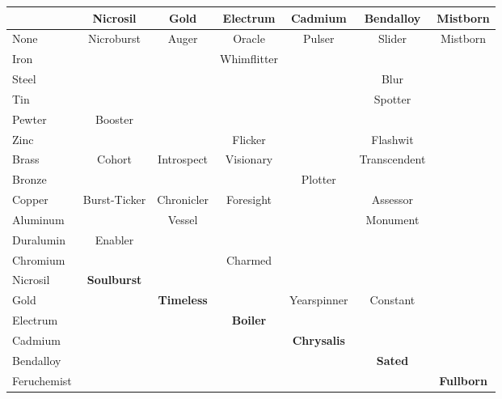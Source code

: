 \documentclass[conference]{IEEEtran}
\newcommand{\n}{\hfill\break}
\begin{document}
\begin{table}[h]
\begin{center}
\begin{tabular}{|l |c |c |c |c |c |c | }
		\cellcolor{black}&Nicrosil&Gold&Electrum&Cadmium&Bendalloy&Mistborn\\\hline
		
		\hline
		None&\cellcolor{darkgreen}Nicroburst&\cellcolor{darkgreen}Auger&\cellcolor{darkgreen}Oracle&\cellcolor{darkgreen}Pulser&\cellcolor{darkgreen}Slider&\cellcolor{darkgreen}Mistborn\\\hline
		Iron& & &\cellcolor{lightgreen}Whimflitter& & & \\\hline
		Steel& & & & &\cellcolor{lightgreen} Blur& \\\hline
		Tin& & & & & \cellcolor{lightgreen}Spotter & \\\hline
		Pewter&\cellcolor{lightgreen}Booster& & & & & \\\hline
		Zinc & & &\cellcolor{lightgreen}Flicker& &\cellcolor{lightgreen}Flashwit& \\\hline
		Brass &\cellcolor{lightorange}Cohort&\cellcolor{lightorange}Introspect &\cellcolor{lightred} Visionary & &\cellcolor{lightorange}Transcendent & \\\hline
		Bronze&& & &\cellcolor{lightgreen}Plotter & & \\\hline
		Copper&\cellcolor{lightgreen}Burst-Ticker &\cellcolor{lightgreen} Chronicler & \cellcolor{lightgreen}Foresight & &  \cellcolor{lightgreen}Assessor& \\\hline
		Aluminum & & \cellcolor{lightgreen} Vessel& & &\cellcolor{lightgreen}Monument& \\\hline
		Duralumin&\cellcolor{lightgreen}Enabler& & & & & \\\hline
		Chromium &  & & \cellcolor{lightgreen}Charmed &  &  &  \\\hline
		Nicrosil& \cellcolor{lightgreen}\textbf{Soulburst} & &  &  &  &  \\\hline
		Gold&  & \cellcolor{lightgreen}\textbf{Timeless} &  &\cellcolor{lightgreen} Yearspinner &\cellcolor{lightgreen} Constant &  \\\hline
		Electrum& & &\cellcolor{lightred}\textbf{Boiler} & & & \\\hline
		Cadmium&   & &  & \cellcolor{lightgreen}\textbf{Chrysalis} &  &  \\\hline
		Bendalloy  &  & &  &  & \cellcolor{lightgreen}\textbf{Sated} &  \\\hline
		Feruchemist&  & & &  &  & \cellcolor{yellow} \textbf{Fullborn}\\\hline
	\end{tabular}\\\n
\end{center}

\end{table}
\end{document}
